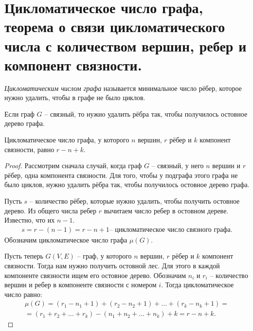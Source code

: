 \section{Цикломатическое число графа, теорема о связи цикломатического числа с количеством вершин, 
ребер и компонент связности.}

\begin{definition}
    \textit{Цикломатическим числом графа} называется минимальное
    число рёбер, которое нужно удалить, чтобы в графе не было циклов.
\end{definition}

Если граф $G$ -- связный, то нужно удалить рёбра так, чтобы получилось
остовное дерево графа.

\begin{theorem}
    Цикломатическое число графа, у которого $n$ вершин, $r$ рёбер и $k$
    компонент связности, равно $r - n + k$.
\end{theorem}

\begin{proof}
    Рассмотрим сначала случай, когда граф $G$ -- связный, у него
    $n$ вершин и $r$ рёбер, одна компонента связности. Для того, чтобы у подграфа
    этого графа не было циклов, нужно удалить рёбра так, чтобы получилось
    остовное дерево графа.

    Пусть $s$ -- количество рёбер, которые нужно удалить, чтобы получить остовное
    дерево. Из общего числа ребер $r$ вычитаем число ребер в остовном дереве.
    Известно, что их $n - 1$.
    \begin{align*}
        s = r - (n - 1) = r - n + 1 \text{-- цикломатическое число связного графа}.
    \end{align*}
    Обозначим цикломатическое число графа $\mu(G)$.

    Пусть теперь $G(V, E)$ -- граф, у которого $n$ вершин, $r$ рёбер и $k$ компонент
    связности. Тогда нам нужно получить остовной лес. Для этого в каждой
    компоненте связности ищем его остовное дерево. Обозначим $n_i$ и $r_i$ --
    количество вершин и ребер в компоненте связности с номером $i$. Тогда
    цикломатическое число равно:
    \begin{multline*}
        \mu(G) = (r_1 - n_1 +1) + (r_2 - n_2 + 1) + \dots + (r_k - n_k + 1) =\\
        = (r_1 + r_2 + \dots + r_k) - (n_1 + n_2 + \dots + n_k) + k = r - n + k.
    \end{multline*}
\end{proof}